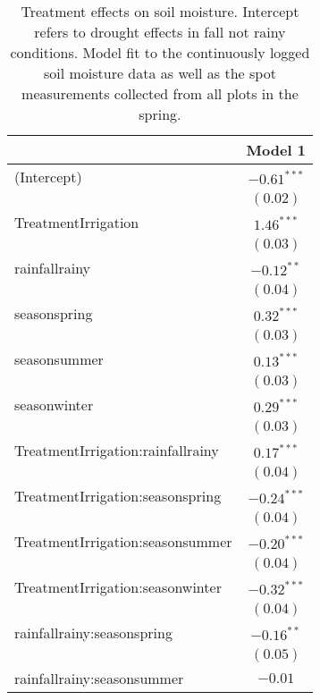 
\begin{table}
\caption{Treatment effects on soil moisture. Intercept refers to drought effects in fall not rainy conditions.  Model fit to the continuously logged soil moisture data as well as the spot measurements collected from all plots in the spring.}
\begin{center}
\begin{tabular}{l c }
\hline
 & Model 1 \\
\hline
(Intercept)                       & $-0.61^{***}$ \\
                                  & $(0.02)$      \\
TreatmentIrrigation               & $1.46^{***}$  \\
                                  & $(0.03)$      \\
rainfallrainy                     & $-0.12^{**}$  \\
                                  & $(0.04)$      \\
seasonspring                      & $0.32^{***}$  \\
                                  & $(0.03)$      \\
seasonsummer                      & $0.13^{***}$  \\
                                  & $(0.03)$      \\
seasonwinter                      & $0.29^{***}$  \\
                                  & $(0.03)$      \\
TreatmentIrrigation:rainfallrainy & $0.17^{***}$  \\
                                  & $(0.04)$      \\
TreatmentIrrigation:seasonspring  & $-0.24^{***}$ \\
                                  & $(0.04)$      \\
TreatmentIrrigation:seasonsummer  & $-0.20^{***}$ \\
                                  & $(0.04)$      \\
TreatmentIrrigation:seasonwinter  & $-0.32^{***}$ \\
                                  & $(0.04)$      \\
rainfallrainy:seasonspring        & $-0.16^{**}$  \\
                                  & $(0.05)$      \\
rainfallrainy:seasonsummer        & $-0.01$       \\

\end{tabular}
\end{center}
\end{table}
